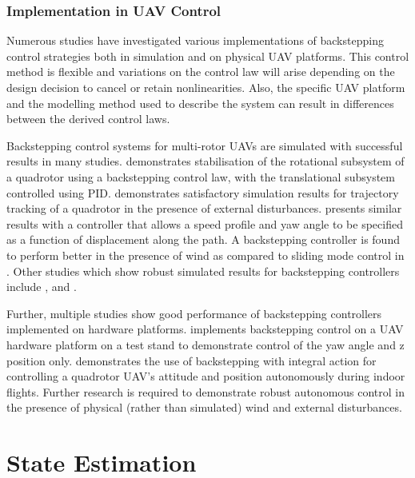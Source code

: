 \subsubsection{Implementation in UAV Control}

Numerous studies have investigated various implementations of backstepping control strategies both in simulation and on physical UAV platforms. This control method is flexible and variations on the control law will arise depending on the design decision to cancel or retain nonlinearities. Also, the specific UAV platform and the modelling method used to describe the system can result in differences between the derived control laws.

Backstepping control systems for multi-rotor UAVs are simulated with successful results in many studies. \cite{Mian2008} demonstrates stabilisation of the rotational subsystem of a quadrotor using a backstepping control law, with the translational subsystem controlled using PID. \cite{ArellanoMuro2013} demonstrates satisfactory simulation results for trajectory tracking of a quadrotor in the presence of external disturbances. \cite{Roza2012} presents similar results with a controller that allows a speed profile and yaw angle to be specified as a function of displacement along the path. A backstepping controller is found to perform better in the presence of wind as compared to sliding mode control in \cite{Moussid2015}. Other studies which show robust simulated results for backstepping controllers include \cite{Madani2006}, \cite{XuanMung2019} and \cite{Shao2018}.

Further, multiple studies show good performance of backstepping controllers implemented on hardware platforms. \cite{Madani2006a} implements backstepping control on a UAV hardware platform on a test stand to demonstrate control of the yaw angle and z position only. \cite{Bouabdallah2006} demonstrates the use of backstepping with integral action for controlling a quadrotor UAV's attitude and position autonomously during indoor flights. Further research is required to demonstrate robust autonomous control in the presence of physical (rather than simulated) wind and external disturbances. 



\section{State Estimation}


